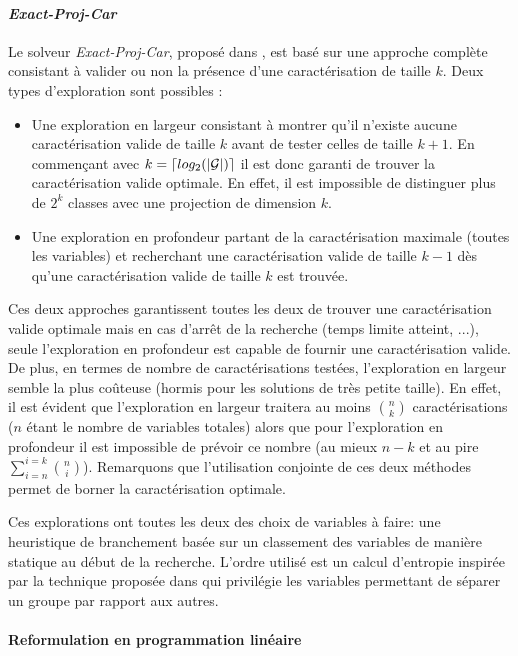 \paragraph{\emph{Exact-Proj-Car}}
Le solveur \emph{Exact-Proj-Car}, proposé dans \cite{sac12}, est basé sur une approche complète consistant à valider ou non la présence d'une caractérisation de taille $k$. Deux types d'exploration sont possibles :
\begin{itemize}
 \item Une exploration en largeur consistant à montrer qu'il n'existe aucune caractérisation valide de taille $k$ avant de tester celles de taille $k+1$. En commençant avec $k= \lceil
log_2(|\cal{G}|)\rceil$ il est donc garanti de trouver la caractérisation valide optimale. En effet, il est impossible de distinguer plus de $2^k$ classes avec une projection de dimension $k$.
 \item Une exploration en profondeur partant de la caractérisation maximale (toutes les variables) et recherchant une caractérisation valide de taille $k-1$ dès qu'une caractérisation valide de taille $k$ est trouvée.
\end{itemize}

Ces deux approches garantissent toutes les deux de trouver une caractérisation valide optimale mais en cas d'arrêt de la recherche (temps limite atteint, ...), seule l'exploration en profondeur est capable de fournir une caractérisation valide. De plus, en termes de nombre de caractérisations testées, l'exploration en largeur semble la plus coûteuse (hormis pour les solutions de très petite taille). En effet, il est évident que l'exploration en largeur traitera au moins $\binom{n}{k}$ caractérisations ($n$ étant le nombre de variables totales) alors que pour l'exploration en profondeur il est impossible de prévoir ce nombre (au mieux $n-k$ et au pire $\sum_{i=n}^{i=k}\binom{n}{i}$). Remarquons que l'utilisation conjointe de ces deux méthodes permet de borner la caractérisation optimale.

Ces explorations ont toutes les deux des choix de variables à faire: une heuristique de branchement basée sur un classement des variables de manière statique au début de la recherche. L'ordre utilisé est un calcul d'entropie inspirée par la technique proposée dans \cite{DesVer81} qui privilégie les variables permettant de séparer un groupe par rapport aux autres.

\paragraph{Reformulation en programmation linéaire}

